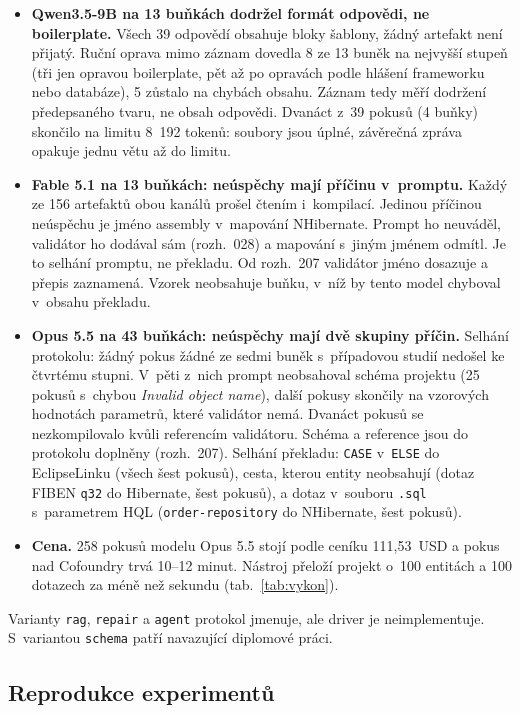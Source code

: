 \begin{itemize}[leftmargin=*,itemsep=1pt]
\item \textbf{Qwen3.5-9B na 13 buňkách dodržel formát odpovědi, ne boilerplate.} Všech 39 odpovědí obsahuje bloky šablony, žádný artefakt není přijatý. Ruční oprava mimo záznam dovedla 8 ze 13 buněk na nejvyšší stupeň (tři jen opravou boilerplate, pět až po opravách podle hlášení frameworku nebo databáze), 5 zůstalo na chybách obsahu. Záznam tedy měří dodržení předepsaného tvaru, ne obsah odpovědi. Dvanáct z~39 pokusů (4 buňky) skončilo na limitu 8~192 tokenů: soubory jsou úplné, závěrečná zpráva opakuje jednu větu až do limitu.
\item \textbf{Fable 5.1 na 13 buňkách: neúspěchy mají příčinu v~promptu.} Každý ze 156 artefaktů obou kanálů prošel čtením i~kompilací. Jedinou příčinou neúspěchu je jméno assembly v~mapování NHibernate. Prompt ho neuváděl, validátor ho dodával sám (rozh.~028) a mapování s~jiným jménem odmítl. Je to selhání promptu, ne překladu. Od rozh.~207 validátor jméno dosazuje a přepis zaznamená. Vzorek neobsahuje buňku, v~níž by tento model chyboval v~obsahu překladu.
\item \textbf{Opus 5.5 na 43 buňkách: neúspěchy mají dvě skupiny příčin.} Selhání protokolu: žádný pokus žádné ze sedmi buněk s~případovou studií nedošel ke čtvrtému stupni. V~pěti z~nich prompt neobsahoval schéma projektu (25 pokusů s~chybou \emph{Invalid object name}), další pokusy skončily na vzorových hodnotách parametrů, které validátor nemá. Dvanáct pokusů se nezkompilovalo kvůli referencím validátoru. Schéma a reference jsou do protokolu doplněny (rozh.~207). Selhání překladu: \texttt{CASE} v~\texttt{ELSE} do EclipseLinku (všech šest pokusů), cesta, kterou entity neobsahují (dotaz FIBEN \texttt{q32} do Hibernate, šest pokusů), a dotaz v~souboru \texttt{.sql} s~parametrem HQL (\texttt{order-repository} do NHibernate, šest pokusů).
\item \textbf{Cena.} 258 pokusů modelu Opus 5.5 stojí podle ceníku 111,53~USD a pokus nad Cofoundry trvá 10--12 minut. Nástroj přeloží projekt o~100 entitách a 100 dotazech za méně než sekundu (tab.~\ref{tab:vykon}).
\end{itemize}

Varianty \texttt{rag}, \texttt{repair} a \texttt{agent} protokol jmenuje, ale driver je neimplementuje. S~variantou \texttt{schema} patří navazující diplomové práci.

\subsection{Reprodukce experimentů}\label{sec:reprodukce}

